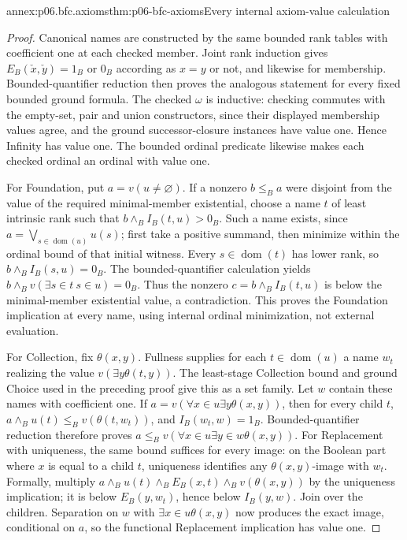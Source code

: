 \begin{annexitem}{annex:p06.bfc.axioms}{thm:p06-bfc-axioms}{Every internal axiom-value calculation}
\begin{proof}
Canonical names are constructed by the same bounded rank tables with
coefficient one at each checked member. Joint rank induction gives
\(E_B(\check x,\check y)=1_B\) or \(0_B\) according as \(x=y\)
or not, and likewise for membership. Bounded-quantifier reduction then
proves the analogous statement for every fixed bounded ground formula.
The checked \(\omega\) is inductive: checking commutes with the
empty-set, pair and union constructors, since their displayed membership
values agree, and the ground successor-closure instances have value one.
Hence Infinity has value one. The bounded ordinal predicate likewise
makes each checked ordinal an ordinal with value one.

For Foundation, put \(a=v(u\ne\varnothing)\). If a nonzero
\(b\leq_B a\) were disjoint from the value of the required minimal-member
existential, choose a name \(t\) of least intrinsic rank such that
\(b\wedge_B I_B(t,u)>0_B\). Such a name exists, since
\(a=\bigvee_{s\in\operatorname{dom}(u)}u(s)\); first take a positive
summand, then minimize within the ordinal bound of that initial witness.
Every \(s\in\operatorname{dom}(t)\) has lower rank, so
\(b\wedge_B I_B(s,u)=0_B\). The bounded-quantifier calculation yields
\(b\wedge_B v(\exists s\in t\ s\in u)=0_B\).
Thus the nonzero \(c=b\wedge_B I_B(t,u)\) is below the minimal-member
existential value, a contradiction. This proves the Foundation implication
at every name, using internal ordinal minimization, not external evaluation.

For Collection, fix \(\theta(x,y)\). Fullness supplies for each
\(t\in\operatorname{dom}(u)\) a name \(w_t\) realizing the value
\(v(\exists y\theta(t,y))\). The least-stage Collection bound and
ground Choice used in the preceding proof give this as a set family.
Let \(w\) contain these names with coefficient one. If
\(a=v(\forall x\in u\exists y\theta(x,y))\), then for every child
\(t\), \(a\wedge_B u(t)\leq_B v(\theta(t,w_t))\), and
\(I_B(w_t,w)=1_B\). Bounded-quantifier reduction therefore proves
\(a\leq_B v(\forall x\in u\exists y\in w\theta(x,y))\).
For Replacement with uniqueness, the same bound suffices for every image:
on the Boolean part where \(x\) is equal to a child \(t\), uniqueness
identifies any \(\theta(x,y)\)-image with \(w_t\). Formally, multiply
\(a\wedge_B u(t)\wedge_B E_B(x,t)\wedge_B v(\theta(x,y))\)
by the uniqueness implication; it is below \(E_B(y,w_t)\), hence below
\(I_B(y,w)\). Join over the children. Separation on \(w\) with
\(\exists x\in u\theta(x,y)\) now produces the exact image, conditional
on \(a\), so the functional Replacement implication has value one.


\end{proof}
\end{annexitem}
